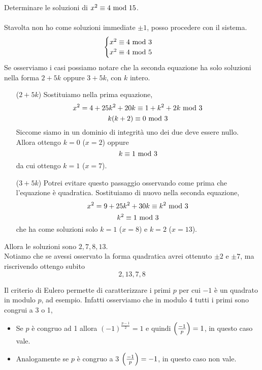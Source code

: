 \begin{esercizio}
	Determinare le soluzioni di $x^2\equiv4\ \mathrm{mod}\ 15$. \\ \\ 
	Stavolta non ho come soluzioni immediate $\pm1$, posso procedere con il sistema.
	\begin{equation*}
	\begin{cases}
	x^2\equiv4\ \mathrm{mod}\ 3\\
	x^2\equiv4\ \mathrm{mod}\ 5
	\end{cases}
	\end{equation*}
	Se osserviamo i casi possiamo notare che la seconda equazione ha solo soluzioni nella forma $2+5k$ oppure $3+5k$, con $k$ intero. 
	\begin{itemize}
		\item[($2+5k$)] Sostituiamo nella prima equazione, 
		\begin{equation*}
		x^2=4+25k^2+20k\equiv1+k^2+2k\ \mathrm{mod}\ 3
		\end{equation*}
		\begin{equation*}
		k(k+2)\equiv0\ \mathrm{mod}\ 3
		\end{equation*}
		Siccome siamo in un dominio di integrità uno dei due deve essere nullo. Allora ottengo $k=0$ ($x=2$) oppure 
		\begin{equation*}
		k\equiv1\ \mathrm{mod}\ 3
		\end{equation*}
		da cui ottengo $k=1$ ($x=7$).
		\item[($3+5k$)] Potrei evitare questo passaggio osservando come prima che l'equazione è quadratica. Sostituiamo di nuovo nella seconda equazione, 
		\begin{equation*}
		x^2=9+25k^2+30k\equiv k^2\ \mathrm{mod}\ 3
		\end{equation*}
		\begin{equation*}
		k^2\equiv1\ \mathrm{mod}\ 3
		\end{equation*}
		che ha come soluzioni solo $k=1$ ($x=8$) e $k=2$ ($x=13$).
	\end{itemize}
	Allora le soluzioni sono $2,7,8,13$. \\ Notiamo che se avessi osservato la forma quadratica avrei ottenuto $\pm2$ e $\pm7$, ma riscrivendo ottengo subito
	\begin{equation*}
	2,13,7,8
	\end{equation*}
\end{esercizio}
\begin{osservazione}
	Il criterio di Eulero permette di caratterizzare i primi $p$ per cui $-1$ è un quadrato in modulo $p$, ad esempio. Infatti osserviamo che in modulo 4 tutti i primi sono congrui a 3 o 1,
	\begin{itemize}
		\item Se $p$ è congruo ad 1 allora $(-1)^{\frac{p-1}{2}}=1$ e quindi $\left(\frac{-1}{p}\right)=1$, in questo caso vale.
		\item Analogamente se $p$ è congruo a 3 $\left(\frac{-1}{p}\right)=-1$, in questo caso non vale.
	\end{itemize}
\end{osservazione}




